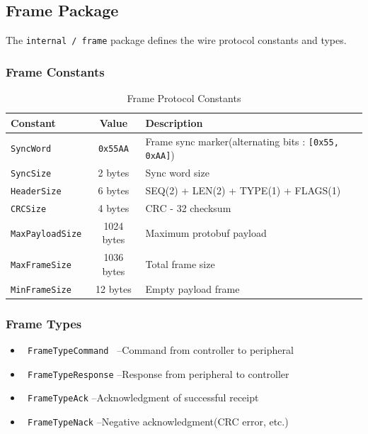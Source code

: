 \subsection{Frame Package}

The \texttt{internal /
            frame} package defines the wire protocol constants and types.

\subsubsection{Frame Constants
}

\begin{table}[H]
\centering
\caption{Frame Protocol Constants}
\label{tab:frame-constants}
\begin{tabular} { | l | c | l |}
\hline
\textbf{Constant} & \textbf{Value} & \textbf{Description}
\\
\hline
\texttt{SyncWord} & \texttt{0x55AA} &
    Frame sync marker(alternating bits
                      : \texttt{[0x55, 0xAA]}) \\
\texttt{SyncSize} &
    2 bytes &Sync word size \\
\texttt{HeaderSize} & 6 bytes &SEQ(2) + LEN(2) + TYPE(1) + FLAGS(1) \\
\texttt{CRCSize} & 4 bytes &CRC - 32 checksum \\
\texttt{MaxPayloadSize} & 1024 bytes &Maximum protobuf payload \\
\texttt{MaxFrameSize} & 1036 bytes &Total frame size \\
\texttt{MinFrameSize} & 12 bytes &Empty payload frame \\
\hline
\end{tabular}
\end{table}

\subsubsection{Frame Types}

\begin{itemize}[leftmargin = 1.5em, topsep = 4pt, itemsep = 2pt]
    \item \texttt {
  FrameTypeCommand
}
--Command from controller to peripheral
    \item \texttt { FrameTypeResponse}
--Response from peripheral to controller
    \item \texttt { FrameTypeAck}
--Acknowledgment of successful receipt
    \item \texttt { FrameTypeNack}
--Negative acknowledgment(CRC error, etc.)
\end{itemize}

